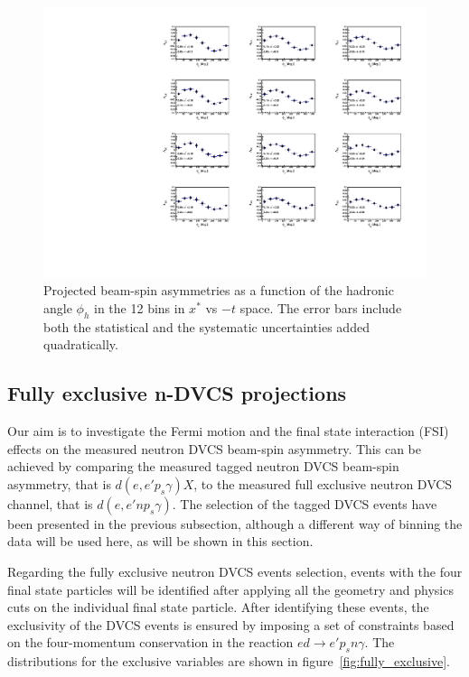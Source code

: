 \begin{figure}[htb]
  \centering
    \includegraphics[width=1.1\textwidth,clip]{figs/pdf/BSA_incoherent_Phi_x_t.pdf}
  \caption{Projected beam-spin asymmetries as a function of the hadronic angle 
   $\phi_h$ in the 12 bins in $x^{*}$ vs $-t$ space. The error bars include 
   both the statistical and the systematic uncertainties added quadratically.
   \label{fig:alu_tagged}}
\end{figure}




\subsection{Fully exclusive n-DVCS projections}
Our aim is to investigate the Fermi motion and the final state interaction 
(FSI) effects on the measured neutron DVCS beam-spin asymmetry.  This can be 
achieved by comparing the measured tagged neutron DVCS beam-spin asymmetry, 
that is $d(e,e'p_s\gamma)X$, to the measured full exclusive neutron DVCS 
channel, that is $d(e,e'np_s\gamma)$.  The selection of the tagged DVCS events 
have been presented in the previous subsection, although a different way of 
binning the data will be used here, as will be shown in this section. 

Regarding the fully exclusive neutron DVCS events selection, events with the 
four final state particles will be identified after applying all the geometry 
and physics cuts on the individual final state particle. After identifying 
these events, the exclusivity of the DVCS events is ensured by imposing a set 
of constraints based on the four-momentum conservation in the reaction 
$ed\rightarrow e'p_{s}n\gamma$.  The distributions for the exclusive variables 
are shown in figure~\ref{fig:fully_exclusive}.


